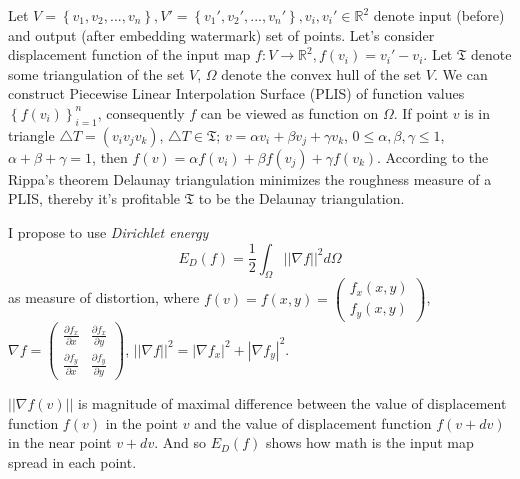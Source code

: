 \documentclass{article}
\begin{document}
Let $V = \left\{v_1, v_2, ... , v_n\right\}, V' = \left\{v_1', v_2', ... , v_n'\right\}, v_i, v_i' \in \mathbb{R}^2$ denote input (before) and output (after embedding watermark) set of points. 
Let's consider displacement function of the input map $f: V \to \mathbb{R}^2, f(v_i) = v_i' - v_i$. Let $\mathfrak{T}$ denote some triangulation of the set $V$, $\Omega$ denote the convex hull of the set $V$. 
We can construct Piecewise Linear Interpolation Surface (PLIS) of function values $\left\{f(v_i)\right\}_{i=1}^n$, consequently $f$ can be viewed as function on $\Omega$. 
If point $v$ is in triangle $\triangle T = (v_i v_j v_k)$, $\triangle T \in \mathfrak{T}$; $v = \alpha v_i + \beta v_j + \gamma v_k$, $0 \le \alpha, \beta, \gamma \le 1$, $\alpha + \beta + \gamma = 1$, then
$f(v) = \alpha f(v_i) + \beta f(v_j) + \gamma f(v_k)$. According to the Rippa's theorem Delaunay triangulation minimizes the roughness measure of a PLIS, thereby it's profitable $\mathfrak{T}$ to be the
Delaunay triangulation.

I propose to use \textit{Dirichlet energy} $$E_D(f) = \frac{1}{2} \int_{\Omega}{||\nabla f||^2}d\Omega$$ as measure of distortion, where $f(v) = f(x, y) = \begin{pmatrix} f_x(x, y) \\ f_y(x, y) \end{pmatrix}$, 
$\nabla f = \begin{pmatrix} \frac{\partial f_x}{\partial x} & \frac{\partial f_x}{\partial y} \\ \frac{\partial f_y}{\partial x} & \frac{\partial f_y}{\partial y} \end{pmatrix}$, 
$||\nabla f||^2 = |\nabla f_x|^2 + |\nabla f_y|^2$. 

$||\nabla f(v)||$ is magnitude of maximal difference between the value 
of displacement function $f(v)$ in the point $v$ and the value of displacement function $f(v + dv)$ in the near point $v + dv$. And so $E_D(f)$ shows how math is the input map spread in each point. 
\end{document}
